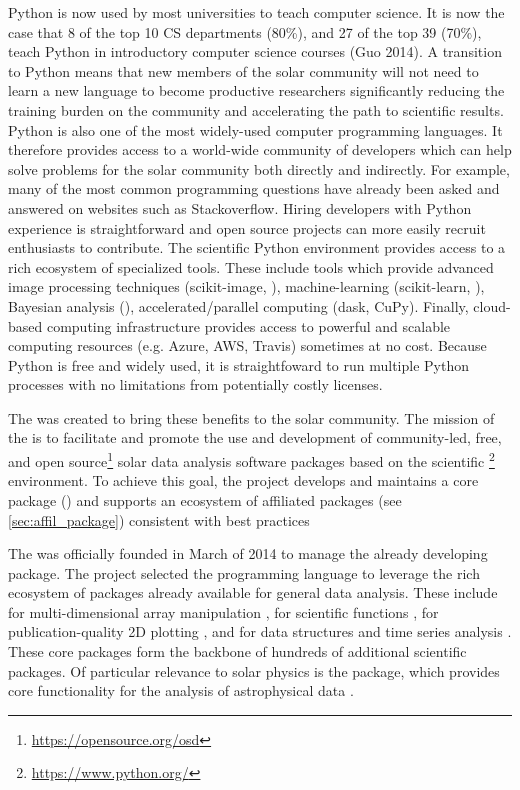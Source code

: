 Python is now used by most universities to teach computer science.
It is now the case that 8 of the top 10 CS departments (80\%), and 27 of the top 39 (70\%), teach Python in introductory computer science courses (Guo 2014).
A transition to Python means that new members of the solar community will not need to learn a new language to become productive researchers significantly reducing the training burden on the community and accelerating the path to scientific results.
Python is also one of the most widely-used computer programming languages.
It therefore provides access to a world-wide community of developers which can help solve problems for the solar community both directly and indirectly.
For example, many of the most common programming questions have already been asked and answered on websites such as Stackoverflow.
Hiring developers with Python experience is straightforward and open source projects can more easily recruit enthusiasts to contribute.
The scientific Python environment provides access to a rich ecosystem of specialized tools.
These include tools which provide advanced image processing techniques (scikit-image, ), machine-learning (scikit-learn, ), Bayesian analysis (), accelerated/parallel computing (dask, CuPy).
Finally, cloud-based computing infrastructure provides access to powerful and scalable computing resources (e.g. Azure, AWS, Travis) sometimes at no cost. Because Python is free and widely used, it is straightfoward to run multiple Python processes with no limitations from potentially costly licenses.

The \sunpyproj was created to bring these benefits to the solar community.
The mission of the \sunpyproj is to facilitate and promote the use and development of community-led, free, and open source\footnote{\url{https://opensource.org/osd}} solar data analysis software packages based on the scientific \python\footnote{\url{https://www.python.org/}} environment.
To achieve this goal, the project develops and maintains a core package (\sunpypkg) and supports an ecosystem of affiliated packages (see \autoref{sec:affil_package}) consistent with best practices \citep{Wilson:2014cka}

The \sunpyproj was officially founded in March of 2014 to manage the already developing \sunpypkg package.
The project selected the \python programming language to leverage the rich ecosystem of packages already available for general data analysis.
These include \numpy for multi-dimensional array manipulation \citep{numpy}, \scipy for scientific functions \citep{scipy}, \matplotlib for publication-quality 2D plotting \citep{matplotlib}, and \pandas for data structures and time series analysis \citep{pandas}.
These core packages form the backbone of hundreds of additional scientific \python packages.
Of particular relevance to solar physics is the \astropypkg package, which provides core functionality for the analysis of astrophysical data \citep{astropy2018}.

